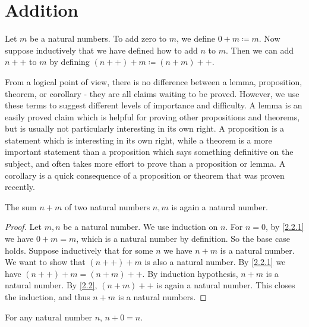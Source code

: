 \section{Addition}\label{sec 2.2}

\begin{definition}\label{2.2.1}
  Let \(m\) be a natural numbers.
  To add zero to \(m\), we define \(0+m \coloneqq m\).
  Now suppose inductively that we have defined how to add \(n\) to \(m\).
  Then we can add \(n++\) to \(m\) by defining \((n++) + m \coloneqq (n + m)++\).
\end{definition}

\begin{note}
  From a logical point of view, there is no difference between a lemma, proposition, theorem, or corollary
  - they are all claims waiting to be proved.
  However, we use these terms to suggest different levels of importance and difficulty.
  A lemma is an easily proved claim which is helpful for proving other propositions and theorems, but is usually not particularly interesting in its own right.
  A proposition is a statement which is interesting in its own right, while a theorem is a more important statement than a proposition which says something definitive on the subject, and often takes more effort to prove than a proposition or lemma.
  A corollary is a quick consequence of a proposition or theorem that was proven recently.
\end{note}

\begin{additional corollary}\label{ac 2.2.1}
The sum \(n + m\) of two natural numbers \(n, m\) is again a natural number.
\end{additional corollary}

\begin{proof}
  Let \(m, n\) be a natural number.
  We use induction on \(n\).
  For \(n = 0\), by \cref{2.2.1} we have \(0 + m = m\), which is a natural number by definition.
  So the base case holds.
  Suppose inductively that for some \(n\) we have \(n + m\) is a natural number.
  We want to show that \((n++) + m\) is also a natural number.
  By \cref{2.2.1} we have \((n++) + m = (n + m)++\).
  By induction hypothesis, \(n + m\) is a natural number.
  By \cref{2.2}, \((n + m)++\) is again a natural number.
  This closes the induction, and thus \(n + m\) is a natural numbers.
\end{proof}

\begin{lemma}\label{2.2.2}
  For any natural number \(n\), \(n + 0 = n\).
\end{lemma}

